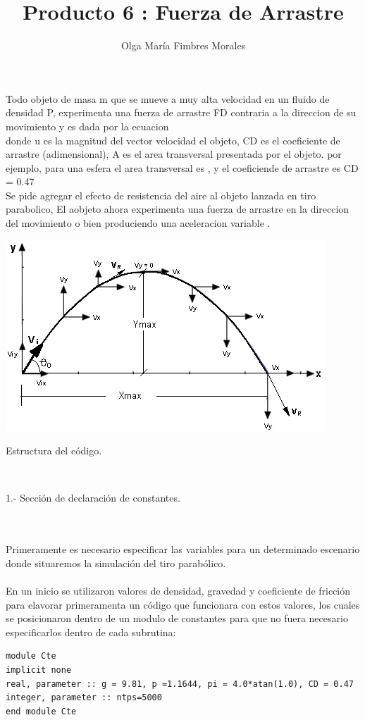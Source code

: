 \documentclass[12pt]{article}
\title{Producto 6 : Fuerza de Arrastre}
\author{Olga María Fimbres Morales}
\date{}
\begin{document}
\maketitle


 
 Todo objeto de masa m que se mueve a muy alta velocidad en un fluido de densidad P, experimenta una fuerza de arrastre FD contraria a la direccion de su movimiento y es dada por la ecuacion \\

donde u es la magnitud del vector velocidad el objeto, CD es el coeficiente de arrastre (adimensional), A es el area transversal presentada por el objeto. por ejemplo, para una esfera el area transversal es  , y el coeficiende de arrastre es CD = 0.47\\

Se pide agregar el efecto de resistencia del aire al objeto lanzada en tiro parabolico, El aobjeto ahora experimenta una fuerza de arrastre en la direccion del movimiento    o bien produciendo una aceleracion variable   .
\begin{center}
\includegraphics[scale=0.8]{Dibujo1.jpg}
\end{center}
\newpage
\begin{LARGE}
Estructura del código.
\end{LARGE}\\

\begin{large}
1.- Sección de declaración de constantes.
\end{large}\\
\\
Primeramente es necesario especificar las variables para un determinado escenario donde situaremos la simulación del tiro parabólico.\\ 
\\
En un inicio se utilizaron valores de densidad, gravedad y coeficiente de fricción para elavorar primeramenta un código que funcionara con estos valores, los cuales se posicionaron dentro de un modulo de constantes para que no fuera necesario especificarlos dentro de cada subrutina:
\begin{center}
\begin{verbatim}
module Cte
implicit none 
real, parameter :: g = 9.81, p =1.1644, pi = 4.0*atan(1.0), CD = 0.47
integer, parameter :: ntps=5000
end module Cte
\end{verbatim}
\end{center}
\end{document}
